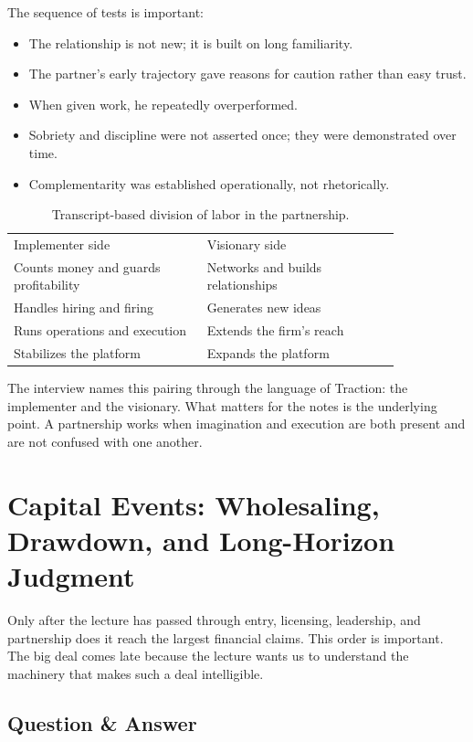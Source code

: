 The sequence of tests is important:
\begin{itemize}
\item The relationship is not new; it is built on long familiarity.
\item The partner's early trajectory gave reasons for caution rather than easy trust.
\item When given work, he repeatedly overperformed.
\item Sobriety and discipline were not asserted once; they were demonstrated over time.
\item Complementarity was established operationally, not rhetorically.
\end{itemize}

\begin{table}[h]
\centering
\begin{tabular}{p{0.42\linewidth}p{0.42\linewidth}}
Implementer side & Visionary side \\
Counts money and guards profitability & Networks and builds relationships \\
Handles hiring and firing & Generates new ideas \\
Runs operations and execution & Extends the firm's reach \\
Stabilizes the platform & Expands the platform \\
\end{tabular}
\caption{Transcript-based division of labor in the partnership.}
\end{table}

The interview names this pairing through the language of Traction: the implementer and the visionary. What matters for the notes is the underlying point. A partnership works when imagination and execution are both present and are not confused with one another.

\section{Capital Events: Wholesaling, Drawdown, and Long-Horizon Judgment}

Only after the lecture has passed through entry, licensing, leadership, and partnership does it reach the largest financial claims. This order is important. The big deal comes late because the lecture wants us to understand the machinery that makes such a deal intelligible.

\subsection{Question \& Answer}

